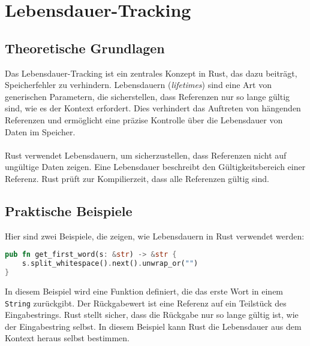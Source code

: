 \chapter{Lebensdauer-Tracking}

\section{Theoretische Grundlagen}
Das Lebensdauer-Tracking ist ein zentrales Konzept in Rust, das dazu beiträgt, Speicherfehler zu verhindern. 
Lebensdauern (\emph{lifetimes}) sind eine Art von generischen Parametern, die sicherstellen, dass Referenzen nur so lange gültig sind, wie es der Kontext erfordert. 
Dies verhindert das Auftreten von hängenden Referenzen und ermöglicht eine präzise Kontrolle über die Lebensdauer von Daten im Speicher.\\
\\
Rust verwendet Lebensdauern, um sicherzustellen, dass Referenzen nicht auf ungültige Daten zeigen. Eine Lebensdauer beschreibt den Gültigkeitsbereich einer Referenz. 
Rust prüft zur Kompilierzeit, dass alle Referenzen gültig sind.

\section{Praktische Beispiele}
Hier sind zwei Beispiele, die zeigen, wie Lebensdauern in Rust verwendet werden:

\begin{lstlisting}[language=Rust, caption={Impliziete lifetime}]
pub fn get_first_word(s: &str) -> &str {
    s.split_whitespace().next().unwrap_or("")
}
\end{lstlisting}
\noindent
In diesem Beispiel wird eine Funktion definiert, die das erste Wort in einem \texttt{String} zurückgibt. 
Der Rückgabewert ist eine Referenz auf ein Teilstück des Eingabestrings.
Rust stellt sicher, dass die Rückgabe nur so lange gültig ist, wie der Eingabestring selbst.
In diesem Beispiel kann Rust die Lebensdauer aus dem Kontext heraus selbst bestimmen.

